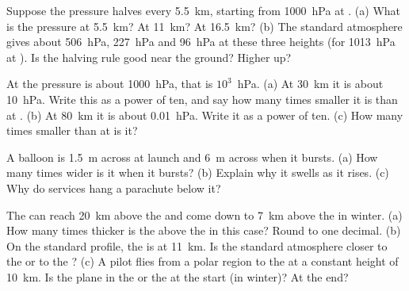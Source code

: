 \begin{exercise}[$\star\star$]\label{exo:g8:the-atmosphere:7}
Suppose the pressure halves every \qty{5.5}{km}, starting from
\qty{1000}{hPa} at . (a) What is the pressure at \qty{5.5}{km}?
At \qty{11}{km}? At \qty{16.5}{km}? (b) The standard atmosphere gives
about \qty{506}{hPa}, \qty{227}{hPa} and \qty{96}{hPa} at these three
heights (for \qty{1013}{hPa} at ). Is the halving rule good
near the ground? Higher up?
\end{exercise}

\begin{exercise}[$\star\star$]\label{exo:g8:the-atmosphere:8}
At  the pressure is about \qty{1000}{hPa}, that is $10^3$~hPa.
(a) At \qty{30}{km} it is about \qty{10}{hPa}. Write this as a power of
ten, and say how many times smaller it is than at . (b) At
\qty{80}{km} it is about \qty{0.01}{hPa}. Write it as a power of ten.
(c) How many times smaller than at  is it?
\end{exercise}

\begin{exercise}[$\star\star$]\label{exo:g8:the-atmosphere:9}
A  balloon is \qty{1.5}{m} across at launch and \qty{6}{m}
across when it bursts. (a) How many times wider is it when it bursts?
(b) Explain why it swells as it rises. (c) Why do  services hang
a parachute below it?
\end{exercise}

\begin{exercise}[$\star\star$]\label{exo:g8:the-atmosphere:10}
The  can reach \qty{20}{km} above the  and come down to
\qty{7}{km} above the  in winter. (a) How many times thicker is the
 above the  in this case? Round to one decimal. (b) On
the standard profile, the  is at \qty{11}{km}. Is the standard
atmosphere closer to the  or to the ? (c) A pilot flies from
a polar region to the  at a constant height of \qty{10}{km}. Is
the plane in the  or the  at the start (in
winter)? At the end?
\end{exercise}

